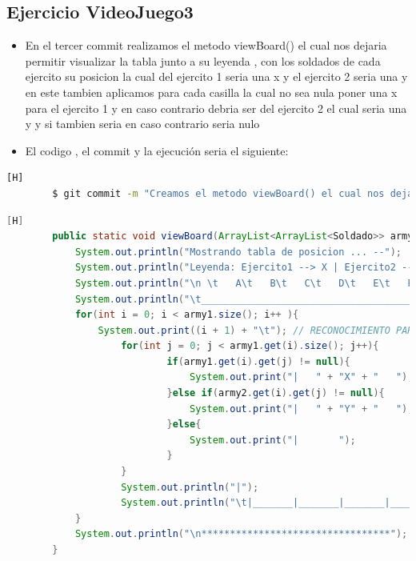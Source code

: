 \documentclass{article}
\begin{document}
	\subsection{Ejercicio VideoJuego3}
	\begin{itemize}	
		\item En el tercer commit realizamos el metodo viewBoard() el cual nos dejaria permitir visualizar la tabla junto a su leyenda , con los soldados de cada ejercito su posicion la cual del ejercito 1 seria una x y el ejercito 2 seria una y en este tambien aplicamos para cada casilla la cual no sea nula poner una x para el ejercito 1 y en caso contrario debria ser del ejercito 2 el cual seria una y y si tambien seria en caso contrario seria nulo
		\item El codigo , el commit  y la ejecución seria el siguiente:
	\end{itemize}	
	\begin{lstlisting}[language=bash,caption={Commit}][H]
		$ git commit -m "Creamos el metodo viewBoard() el cual nos dejaria permitir visualizar la tabla con los soldados de cada ejercito su posicion la cual del ejercito 1 seria una x y el ejercito 2 seria una y en este tambien aplicamos para cada casilla la cual no sea nula poner una x para el ejercito 1 y en caso contrario debria ser del ejercito 2 el cual seria una y y si tambien seria en caso contrario seria nulo
	\end{lstlisting}	
	\begin{lstlisting}[language=java,caption={Las lineas de codigos del metodo creado:}][H]
		public static void viewBoard(ArrayList<ArrayList<Soldado>> army1, ArrayList<ArrayList<Soldado>> army2){ //EN ESTE METODO NOS AYUDAMOS DEL ANTERIOR ARCHIVO YA QUE TENDRIAMOS UNA BASE PARA PODER CREARLO
			System.out.println("Mostrando tabla de posicion ... --");
			System.out.println("Leyenda: Ejercito1 --> X | Ejercito2 --> Y"); //RECONOCIMIENTO PARA LOS EJERCITOS Y POSICION DE SUS SOLDADOS
			System.out.println("\n \t   A\t   B\t   C\t   D\t   E\t   F\t   G\t   H\t   I\t   J"); // RECONOCIMIENTO PARA CADA UBICACION DE CADA SOLDADO EN EL TABLERO POR PARTE DE LAS COLUMNAS
			System.out.println("\t_________________________________________________________________________________");
			for(int i = 0; i < army1.size(); i++ ){
				System.out.print((i + 1) + "\t"); // RECONOCIMIENTO PARA CADA UBICACION DE CADA SOLDADO EN EL TABLERO POR PARTE DE LAS FILAS
					for(int j = 0; j < army1.get(i).size(); j++){
							if(army1.get(i).get(j) != null){
								System.out.print("|   " + "X" + "   "); //VERIFICANDOLA POSICIONES DE CADA SOLDADO DE CADA EJERCITO CON SU RESPECTIVO INDICADOR PARA PODER UBICARLOS
							}else if(army2.get(i).get(j) != null){
								System.out.print("|   " + "Y" + "   ");
							}else{
								System.out.print("|       ");
							}
					}
					System.out.println("|");
					System.out.println("\t|_______|_______|_______|_______|_______|_______|_______|_______|_______|_______|");
			}
			System.out.println("\n*********************************");
		}
	\end{lstlisting}
\end{document}
